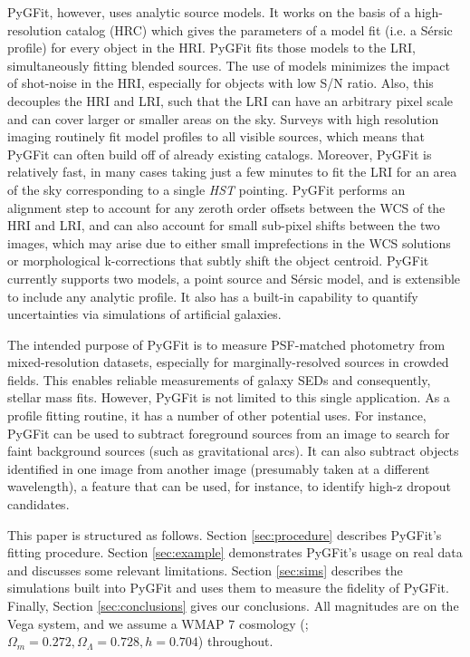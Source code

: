\documentclass[apj]{emulateapj}
\newcommand{\sersic}{S\'{e}rsic}
\newcommand{\pygfit}{PyGFit}
\begin{document}
\pygfit{}, however, uses analytic source models.  It works on the basis of a high-resolution catalog (HRC) which gives the parameters of a model fit (i.e. a \sersic{} profile) for every object in the HRI.  \pygfit{} fits those models to the LRI, simultaneously fitting blended sources.  The use of models minimizes the impact of shot-noise in the HRI, especially for objects with low S/N ratio.  Also, this decouples the HRI and LRI, such that the LRI can have an arbitrary pixel scale and can cover larger or smaller areas on the sky.  Surveys with high resolution imaging routinely fit model profiles to all visible sources, which means that \pygfit{} can often build off of already existing catalogs.  Moreover, \pygfit{} is relatively fast, in many cases taking just a few minutes to fit the LRI for an area of the sky corresponding to a single {\itshape HST} pointing.  \pygfit{} performs an alignment step to account for any zeroth order offsets between the WCS of the HRI and LRI, and can also account for small sub-pixel shifts between the two images, which may arise due to either small imprefections in the WCS solutions or morphological k-corrections that subtly shift the object centroid.  \pygfit{} currently supports two models, a point source and \sersic{} model, and is extensible to include any analytic profile.  It also has a built-in capability to quantify uncertainties via simulations of artificial galaxies.

The intended purpose of \pygfit{} is to measure PSF-matched photometry from mixed-resolution datasets, especially for marginally-resolved sources in crowded fields.  This enables reliable measurements of galaxy SEDs and consequently, stellar mass fits.  However, \pygfit{} is not limited to this single application.  As a profile fitting routine, it has a number of other potential uses.  For instance, \pygfit{} can be used to subtract foreground sources from an image to search for faint background sources (such as gravitational arcs).  It can also subtract objects identified in one image from another image (presumably taken at a different wavelength), a feature that can be used, for instance, to identify high-z dropout candidates.

This paper is structured as follows.  Section \ref{sec:procedure} describes \pygfit{}'s fitting procedure.  Section \ref{sec:example} demonstrates \pygfit{}'s usage on real data and discusses some relevant limitations.  Section \ref{sec:sims} describes the simulations built into \pygfit{} and uses them to measure the fidelity of \pygfit{}.  Finally, Section \ref{sec:conclusions} gives our conclusions.  All magnitudes are on the Vega system, and we assume a WMAP 7 cosmology (\citealt{komatsu11}; $\Omega_m=0.272, \Omega_\Lambda=0.728, h=0.704$) throughout.
\end{document}
